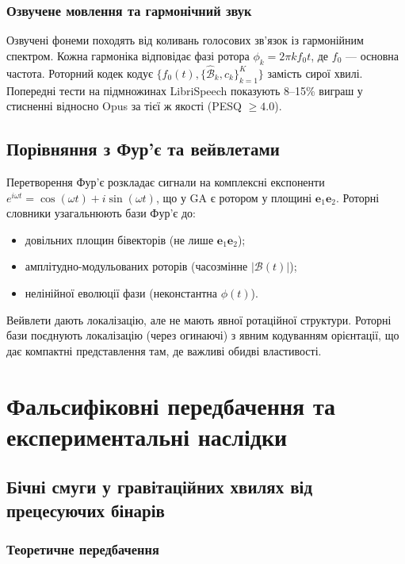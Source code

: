 \documentclass[11pt,a4paper]{article}
\newcommand{\e}{\mathbf{e}}
\newcommand{\Biv}{\mathcal{B}}
\theoremstyle{definition}
\theoremstyle{plain}
\theoremstyle{remark}
\begin{document}
\subsubsection{Озвучене мовлення та гармонічний звук}

Озвучені фонеми походять від коливань голосових зв’язок із гармонійним спектром. Кожна гармоніка відповідає фазі ротора $\phi_k = 2\pi k f_0 t$, де $f_0$ — основна частота. Роторний кодек кодує $\{f_0(t), \{\hat{\Biv}_k, c_k\}_{k=1}^K\}$ замість сирої хвилі. Попередні тести на підмножинах LibriSpeech показують 8–15\% виграш у стисненні відносно Opus за тієї ж якості (PESQ $\ge 4.0$).

\subsection{Порівняння з Фур’є та вейвлетами}

Перетворення Фур’є розкладає сигнали на комплексні експоненти $e^{i\omega t} = \cos(\omega t) + i\sin(\omega t)$, що у GA є ротором у площині $\e_1\e_2$. Роторні словники узагальнюють бази Фур’є до:
\begin{itemize}
  \item довільних площин бівекторів (не лише $\e_1\e_2$);
  \item амплітудно-модульованих роторів (часозмінне $|\Biv(t)|$);
  \item нелінійної еволюції фази (неконстантна $\phi(t)$).
\end{itemize}

Вейвлети дають локалізацію, але не мають явної ротаційної структури. Роторні бази поєднують локалізацію (через огинаючі) з явним кодуванням орієнтації, що дає компактні представлення там, де важливі обидві властивості.

\vspace{1em}

\section{Фальсифіковні передбачення та експериментальні наслідки}\label{sec:predictions}

\subsection{Бічні смуги у гравітаційних хвилях від прецесуючих бінарів}

\subsubsection{Теоретичне передбачення}
\end{document}
